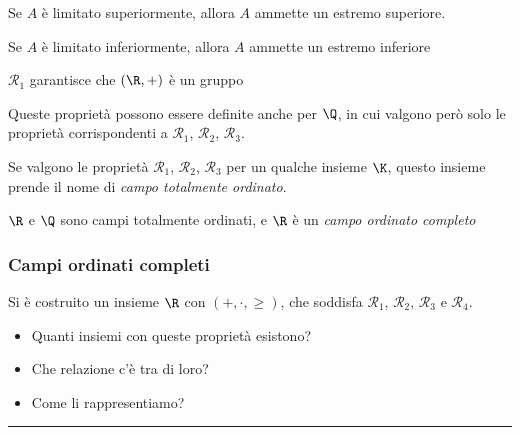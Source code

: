 \begin{itemize}
    Se $ A $ è limitato superiormente, allora $ A $ ammette un estremo superiore.
    
    Se $ A $ è limitato inferiormente, allora $ A $ ammette un estremo inferiore

\end{itemize}

$ \mathcal{R}_1 $ garantisce che $ (\R, +) $ è un gruppo

Queste proprietà possono essere definite anche per $ \Q $, in cui valgono però solo le proprietà corrispondenti a $ \mathcal{R}_1 $, $ \mathcal{R}_2 $, $ \mathcal{R}_3 $.

Se valgono le proprietà $ \mathcal{R}_1 $, $ \mathcal{R}_2 $, $ \mathcal{R}_3 $ per un qualche insieme $ \K $, questo insieme prende il nome di \textit{campo totalmente ordinato}.

$ \R $ e $ \Q $ sono campi totalmente ordinati, e $ \R $ è un \textit{campo ordinato completo}

\subsubsection{Campi ordinati completi}

Si è costruito un insieme $ \R $ con $ (+, \cdot, \ge) $, che soddisfa $ \mathcal{R}_1 $, $ \mathcal{R}_2 $, $ \mathcal{R}_3 $ e $ \mathcal{R}_4 $.
\begin{itemize}
    \item Quanti insiemi con queste proprietà esistono?
    \item Che relazione c'è tra di loro?
    \item Come li rappresentiamo?
\end{itemize}

\rule{7em}{.4pt}


